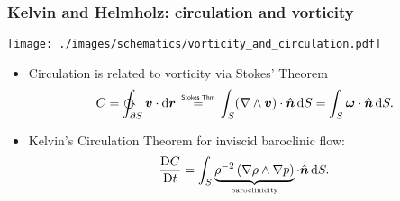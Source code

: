 \documentclass[10pt]{beamer}
\newcommand\myeqq{\mathrel{\overset{\makebox[0pt]{\mbox{\normalfont\tiny\sffamily Stokes Thm}}}{=}}}
\begin{document}
\begin{frame}
  \frametitle{Kelvin and Helmholz: circulation and vorticity}

\begin{center}
\vspace{-.3cm}
\hspace{1cm} 
{\texttt{[image: ./images/schematics/vorticity\_and\_circulation.pdf]}}
\hspace{1cm}



\vspace{-.3cm}

\end{center}

\begin{exampleblock}{}
\begin{itemize}

\item Circulation is related to vorticity via Stokes' Theorem 
\begin{equation}
  C = \ointctrclockwise_{\partial S} {\bm v} \cdot \mathrm{d}{\bm r}   
 \; \; \; \;  \myeqq \; \; \; \;
 \int_{S} (\nabla \wedge {\bm v})  \cdot \hat{\bm n} \, \mathrm{d}S 
= \int_{S} {\bm \omega} \cdot \hat{\bm n} \, \mathrm{d}S.
\end{equation}

\item Kelvin's Circulation Theorem for inviscid baroclinic flow: 
\begin{equation}
  \frac{\mathrm{D}C}{\mathrm{D}t} 
= \int_{S}  \underbrace{ \rho^{-2} \, ( \nabla \rho \wedge \nabla p ) }_{\mbox{\tiny baroclinicity}} \cdot \hat{\bm n} \, \mathrm{d}S.
\end{equation}
 

\end{itemize}
\end{exampleblock}{}

\end{frame}
\end{document}
